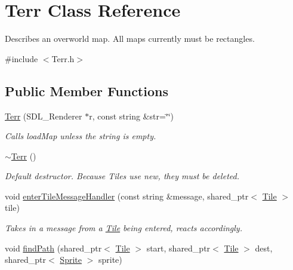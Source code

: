 \hypertarget{class_terr}{}\section{Terr Class Reference}
\label{class_terr}


Describes an overworld map. All maps currently must be rectangles.  




{\ttfamily \#include $<$Terr.\+h$>$}

\subsection*{Public Member Functions}
\begin{DoxyCompactItemize}
\item 
\hyperlink{class_terr_ab2a5e584780b6213d1bf5a7dc3a74c59}{Terr} (S\+D\+L\+\_\+\+Renderer $\ast$r, const string \&str=\char`\"{}\char`\"{})\hypertarget{class_terr_ab2a5e584780b6213d1bf5a7dc3a74c59}{}\label{class_terr_ab2a5e584780b6213d1bf5a7dc3a74c59}

\begin{DoxyCompactList}\small\item\em Calls load\+Map unless the string is empty. \end{DoxyCompactList}\item 
\hyperlink{class_terr_a8b68000bbfdc821e364bdb89f4465c17}{$\sim$\+Terr} ()\hypertarget{class_terr_a8b68000bbfdc821e364bdb89f4465c17}{}\label{class_terr_a8b68000bbfdc821e364bdb89f4465c17}

\begin{DoxyCompactList}\small\item\em Default destructor. Because Tiles use new, they must be deleted. \end{DoxyCompactList}\item 
void \hyperlink{class_terr_a6b79ff79c2ffbe2606f5906b3f23df12}{enter\+Tile\+Message\+Handler} (const string \&message, shared\+\_\+ptr$<$ \hyperlink{class_tile}{Tile} $>$ tile)\hypertarget{class_terr_a6b79ff79c2ffbe2606f5906b3f23df12}{}\label{class_terr_a6b79ff79c2ffbe2606f5906b3f23df12}

\begin{DoxyCompactList}\small\item\em Takes in a message from a \hyperlink{class_tile}{Tile} being entered, reacts accordingly. \end{DoxyCompactList}\item 
void \hyperlink{class_terr_ad0596843b8e4c1ddd9b39220837b88ce}{find\+Path} (shared\+\_\+ptr$<$ \hyperlink{class_tile}{Tile} $>$ start, shared\+\_\+ptr$<$ \hyperlink{class_tile}{Tile} $>$ dest, shared\+\_\+ptr$<$ \hyperlink{class_sprite}{Sprite} $>$ sprite)\hypertarget{class_terr_ad0596843b8e4c1ddd9b39220837b88ce}{}\label{class_terr_ad0596843b8e4c1ddd9b39220837b88ce}


\end{DoxyCompactItemize}
